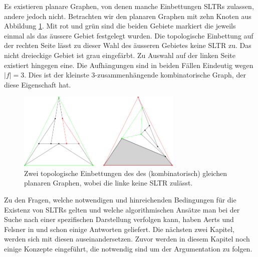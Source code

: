 \begin{example}\label{bsp1}
Es existieren planare Graphen, von denen manche Einbettungen SLTRs zulassen, andere jedoch nicht. Betrachten wir den planaren Graphen mit zehn Knoten aus Abbildung \ref{10_example}. Mit rot und grün sind die beiden Gebiete markiert die jeweils einmal als das äussere Gebiet festgelegt wurden. Die topologische Einbettung auf der rechten Seite lässt zu dieser Wahl des äusseren Gebietes keine SLTR zu. Das nicht dreieckige Gebiet ist grau eingefärbt. Zu Auswahl auf der linken Seite existiert hingegen eine. Die Aufhängungen sind in beiden Fällen Eindeutig wegen $|f|=3$. Dies ist der kleinste 3-zusammenhängende kombinatorische Graph, der diese Eigenschaft hat.

\begin{figure}[h]
\centering
\includegraphics[width=0.7\textwidth]{10_example.png}
\caption{Zwei topologische Einbettungen des des (kombinatorisch) gleichen planaren Graphen, wobei die linke keine SLTR zulässt.}
\label{10_example}
\end{figure}

\end{example}

Zu den Fragen, welche notwendigen und hinreichenden Bedingungen für die Existenz von SLTRs gelten und welche algorithmischen Ansätze man bei der Suche nach einer spezifischen Darstellung verfolgen kann, haben Aerts und Felsner in \cite{af13h,} und \cite{af15} schon einige Antworten geliefert. Die nächsten zwei Kapitel, werden sich mit diesen auseinandersetzen. Zuvor werden in diesem Kapitel noch einige Konzepte eingeführt, die notwendig sind um der Argumentation zu folgen.